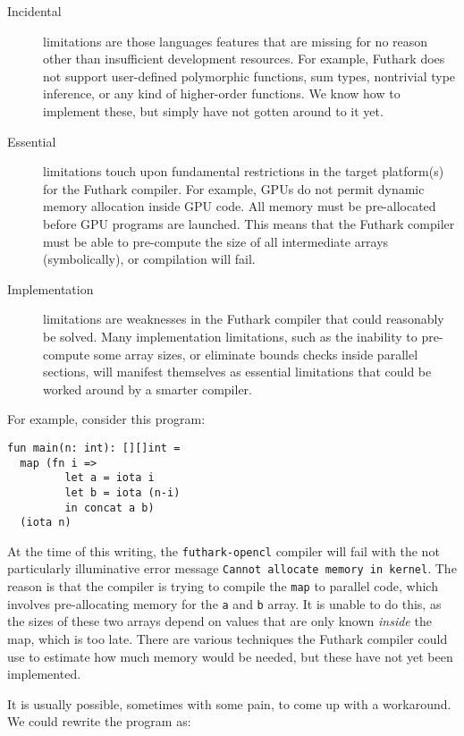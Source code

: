 \documentclass[oneside,11pt]{book}
\begin{document}
\begin{description}
\item[Incidental] limitations are those languages features that are
  missing for no reason other than insufficient development resources.
  For example, Futhark does not support user-defined polymorphic
  functions, sum types, nontrivial type inference, or any kind of
  higher-order functions.  We know how to implement these, but simply
  have not gotten around to it yet.

\item[Essential] limitations touch upon fundamental restrictions in
  the target platform(s) for the Futhark compiler.  For example, GPUs
  do not permit dynamic memory allocation inside GPU code.  All memory
  must be pre-allocated before GPU programs are launched.  This means
  that the Futhark compiler must be able to pre-compute the size of
  all intermediate arrays (symbolically), or compilation will fail.

\item[Implementation] limitations are weaknesses in the Futhark
  compiler that could reasonably be solved.  Many implementation
  limitations, such as the inability to pre-compute some array sizes,
  or eliminate bounds checks inside parallel sections, will manifest
  themselves as essential limitations that could be worked around by a
  smarter compiler.
\end{description}

For example, consider this program:

\begin{lstlisting}
fun main(n: int): [][]int =
  map (fn i =>
         let a = iota i
         let b = iota (n-i)
         in concat a b)
  (iota n)
\end{lstlisting}

At the time of this writing, the \texttt{futhark-opencl} compiler will
fail with the not particularly illuminative error message
\texttt{Cannot allocate memory in kernel}.  The reason is that the
compiler is trying to compile the \texttt{map} to parallel code, which
involves pre-allocating memory for the \texttt{a} and \texttt{b}
array.  It is unable to do this, as the sizes of these two arrays
depend on values that are only known \textit{inside} the map, which is
too late.  There are various techniques the Futhark compiler could use
to estimate how much memory would be needed, but these have not yet
been implemented.

It is usually possible, sometimes with some pain, to come up with a
workaround.  We could rewrite the program as:
\end{document}
